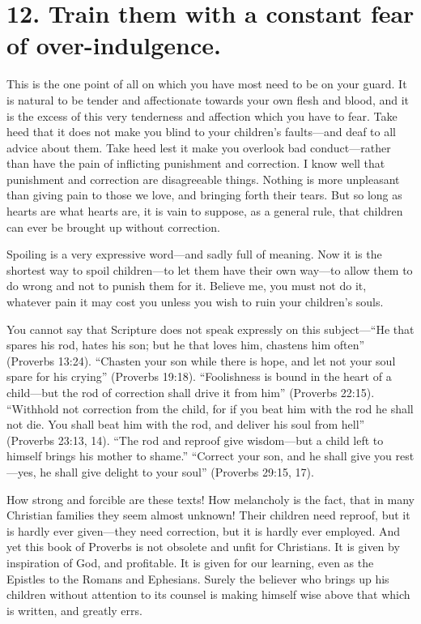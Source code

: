 \documentclass[
]{book}
\begin{document}
\hypertarget{train-them-with-a-constant-fear-of-over-indulgence.}{%
\section*{12. Train them with a constant fear of over-indulgence.}\label{train-them-with-a-constant-fear-of-over-indulgence.}}

This is the one point of all on which you have most need to be on your guard. It is natural to be tender and affectionate towards your own flesh and blood, and it is the excess of this very tenderness and affection which you have to fear. Take heed that it does not make you blind to your children's faults---and deaf to all advice about them. Take heed lest it make you overlook bad conduct---rather than have the pain of inflicting punishment and correction. I know well that punishment and correction are disagreeable things. Nothing is more unpleasant than giving pain to those we love, and bringing forth their tears. But so long as hearts are what hearts are, it is vain to suppose, as a general rule, that children can ever be brought up without correction.

Spoiling is a very expressive word---and sadly full of meaning. Now it is the shortest way to spoil children---to let them have their own way---to allow them to do wrong and not to punish them for it. Believe me, you must not do it, whatever pain it may cost you unless you wish to ruin your children's souls.

You cannot say that Scripture does not speak expressly on this subject---``He that spares his rod, hates his son; but he that loves him, chastens him often'' (Proverbs 13:24). ``Chasten your son while there is hope, and let not your soul spare for his crying'' (Proverbs 19:18). ``Foolishness is bound in the heart of a child---but the rod of correction shall drive it from him'' (Proverbs 22:15). ``Withhold not correction from the child, for if you beat him with the rod he shall not die. You shall beat him with the rod, and deliver his soul from hell'' (Proverbs 23:13, 14). ``The rod and reproof give wisdom---but a child left to himself brings his mother to shame.'' ``Correct your son, and he shall give you rest---yes, he shall give delight to your soul'' (Proverbs 29:15, 17).

How strong and forcible are these texts! How melancholy is the fact, that in many Christian families they seem almost unknown! Their children need reproof, but it is hardly ever given---they need correction, but it is hardly ever employed. And yet this book of Proverbs is not obsolete and unfit for Christians. It is given by inspiration of God, and profitable. It is given for our learning, even as the Epistles to the Romans and Ephesians. Surely the believer who brings up his children without attention to its counsel is making himself wise above that which is written, and greatly errs.
\end{document}
